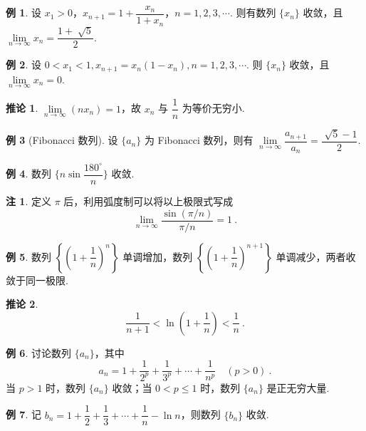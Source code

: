 \documentclass[zihao=-4,linespread=1.8,UTF8,nothm]{aytony_base}
\theoremstyle{definition}
\newtheorem*{corollary}{\indent\heiti\textbf{推论}}
\newtheorem{example}{\indent\heiti\textbf{例}}[subsection]
\newtheorem*{remark*}{\indent\heiti\textbf{注}}
\begin{document}
\begin{example}
    设 $x_1 > 0$，$x_{n+1} = 1 + \dfrac{x_n}{1+x_n}$，$n = 1, 2, 3, \cdots$. 则有数列 $\{x_n\}$ 收敛，且 $\lim\limits_{n \to \infty} x_n = \dfrac{1+\sqrt[]{5}}{2}$.
\end{example}

\begin{example}
    设 $0 < x_1 < 1, x_{n+1} = x_n(1-x_n),n = 1, 2, 3, \cdots$. 则 $\{x_n\}$ 收敛，且 $\lim\limits_{n \to \infty} x_n = 0$.
\end{example}

\begin{corollary}
    $\lim\limits_{n \to \infty}(nx_n) = 1$，故 $x_n$ 与 $\dfrac{1}{n}$ 为等价无穷小.
\end{corollary}

\setcounter{example}{3}

\begin{example}[Fibonacci 数列]
    设 $\{a_n\}$ 为 Fibonacci 数列，则有 $\lim\limits_{n \to \infty} \dfrac{a_{n+1}}{a_n} = \dfrac{\sqrt[]{5}-1}{2}$.
\end{example}

\begin{example}
    数列 $\{n\sin \dfrac{180^\circ}{n}\}$ 收敛.
\end{example}

\begin{remark*}
    定义 $\pi$ 后，利用弧度制可以将以上极限式写成 $$
        \lim\limits_{n \to \infty} \dfrac{\sin(\pi/n)}{\pi/n} = 1\ .$$
\end{remark*}

\begin{example}
    数列 $\left\{\left(1+\dfrac{1}{n}\right)^n\right\}$ 单调增加，数列 $\left\{\left(1+\dfrac{1}{n}\right)^{n+1}\right\}$ 单调减少，两者收敛于同一极限.
\end{example}

\begin{corollary}
    $$\dfrac{1}{n+1} < \ln (1 + \dfrac{1}{n}) < \dfrac{1}{n}\ .$$
\end{corollary}

\begin{example}
    讨论数列 $\{a_n\}$，其中 $$
        a_n = 1 + \dfrac{1}{2^p} + \dfrac{1}{3^p} + \cdots + \dfrac{1}{n^p}\quad (p > 0)\ .
    $$ 当 $p>1$ 时，数列 $\{a_n\}$ 收敛；当 $0 < p \leqslant 1$ 时，数列 $\{a_n\}$ 是正无穷大量.
\end{example}

\begin{example}
    记 $b_n = 1 + \dfrac{1}{2} + \dfrac{1}{3} + \cdots + \dfrac{1}{n} - \ln n $，则数列 $\{b_n\}$ 收敛.
\end{example}
\end{document}
